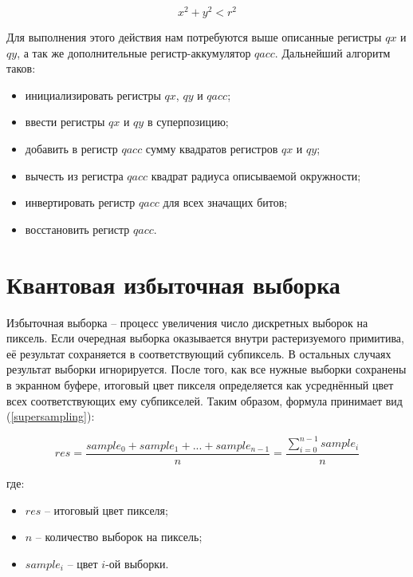 \begin{equation}
	\label{for:circle2}
	x^2 + y^2 < r^2
\end{equation}

Для выполнения этого действия нам потребуются выше описанные регистры $qx$ и $qy$, а так же дополнительные регистр-аккумулятор $qacc$. Дальнейший алгоритм таков:

\begin{itemize}
	\item инициализировать регистры $qx$, $qy$ и $qacc$;
	\item ввести регистры $qx$ и $qy$ в суперпозицию;
	\item добавить в регистр $qacc$ сумму квадратов регистров $qx$ и $qy$;
	\item вычесть из регистра $qacc$ квадрат радиуса описываемой окружности;
	\item инвертировать регистр $qacc$ для всех значащих битов;
	\item восстановить регистр $qacc$.
\end{itemize}

\section{Квантовая избыточная выборка}

Избыточная выборка -- процесс увеличения число дискретных выборок на пиксель. Если очередная выборка оказывается внутри растеризуемого примитива, её результат сохраняется в соответствующий субпиксель. В остальных случаях результат выборки игнорируется. После того, как все нужные выборки сохранены в экранном буфере, итоговый цвет пикселя определяется как усреднённый цвет всех соответствующих ему субпикселей. Таким образом, формула принимает вид (\ref{supersampling}): 

\begin{equation}
	\label{supersampling}
	res = \frac{sample_{0} + sample_{1} + ... + sample_{n-1}}{n} = \frac{\sum_{i=0}^{n - 1} sample_{i}}{n}
\end{equation}

где:

\begin{itemize}
\item $res$ -- итоговый цвет пикселя;
\item $n$ -- количество выборок на пиксель;
\item $sample_{i}$ -- цвет $i$-ой выборки.
\end{itemize}

